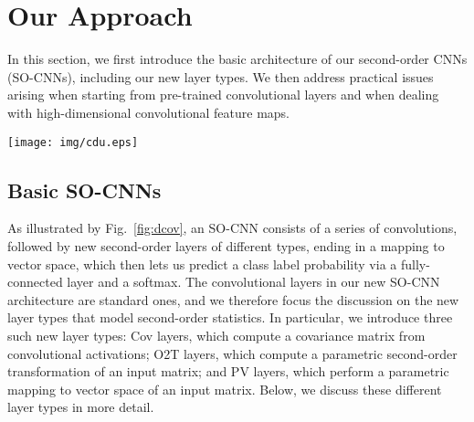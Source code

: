 
\section{Our Approach}

In this section, we first introduce the basic architecture of our second-order CNNs (SO-CNNs), including our new layer types. We then address practical issues arising when starting from pre-trained convolutional layers and when dealing with high-dimensional convolutional feature maps.

\begin{figure*}
\begin{center}
\texttt{[image: img/cdu.eps]}
\end{center}
   \caption{Figure of general model design}
\label{fig:dcov}
\end{figure*}

\subsection{Basic SO-CNNs}
\label{sec:basic}

As illustrated by Fig.~\ref{fig:dcov}, an SO-CNN consists of a series of convolutions, followed by new second-order layers of different types, ending in a mapping to vector space, which then lets us predict a class label probability via a fully-connected layer and a softmax. The convolutional layers in our new SO-CNN architecture are standard ones, and we therefore focus the discussion on the new layer types that model second-order statistics. In particular, we introduce three such new layer types: Cov layers, which compute a covariance matrix from convolutional activations; O2T layers, which compute a parametric second-order transformation of an input matrix; and PV layers, which perform a parametric mapping to vector space of an input matrix. Below, we discuss these different layer types in more detail.




